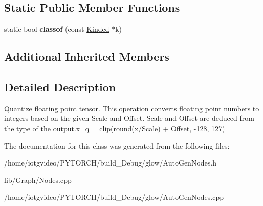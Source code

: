 \subsection*{Static Public Member Functions}
\begin{DoxyCompactItemize}
\item 
\mbox{\label{classglow_1_1_quantize_node_a6fc1e64164e35ff4f89c5ae559e51a0d}} 
static bool {\bfseries classof} (const \hyperlink{classglow_1_1_kinded}{Kinded} $\ast$k)
\end{DoxyCompactItemize}
\subsection*{Additional Inherited Members}


\subsection{Detailed Description}
Quantize floating point tensor. This operation converts floating point numbers to integers based on the given Scale and Offset. Scale and Offset are deduced from the type of the output.\+x\+\_\+q = clip(round(x/\+Scale) + Offset, -\/128, 127) 

The documentation for this class was generated from the following files\+:\begin{DoxyCompactItemize}
\item 
/home/iotgvideo/\+P\+Y\+T\+O\+R\+C\+H/build\+\_\+\+Debug/glow/Auto\+Gen\+Nodes.\+h\item 
lib/\+Graph/Nodes.\+cpp\item 
/home/iotgvideo/\+P\+Y\+T\+O\+R\+C\+H/build\+\_\+\+Debug/glow/Auto\+Gen\+Nodes.\+cpp\end{DoxyCompactItemize}
